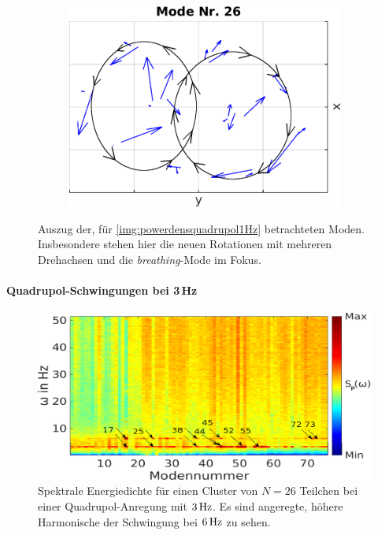 \documentclass[numbers=noenddot,a4paper,notitlepage,twoside,BCOR15mm]{scrbook}
\newcommand{\tilt}[1]{\textit{#1}}
\begin{document}
\begin{figure}[!t]
								\begin{subfigure}[t]{0.325\textwidth}
									\centering
									\includegraphics[width=\textwidth,height=0.8\textwidth]{figs/auswertung/manipulation/quadrupol1HzModeNr26.png}
								\end{subfigure}
								\caption{Auszug der, für \ref{img:powerdensquadrupol1Hz} betrachteten Moden. Insbesondere stehen hier die neuen Rotationen mit mehreren Drehachsen und die \tilt{breathing}-Mode im Fokus.}\label{img:modenquadrupol1Hz}
							\end{figure}


					\paragraph{Quadrupol-Schwingungen bei 3\,Hz}

							\begin{figure}[!b]
								\centering
								\includegraphics[width=\textwidth]{figs/auswertung/manipulation/quadrupol3Hzpowerdens.png}
								\caption{Spektrale Energiedichte für einen Cluster von $N=26$ Teilchen bei einer Quadrupol-Anregung mit $\unit[3]{Hz}$. Es sind angeregte, höhere Harmonische der Schwingung bei $\unit[6]{Hz}$ zu sehen.}\label{img:powerdensquadrupol3Hz}
							\end{figure}
\end{document}
